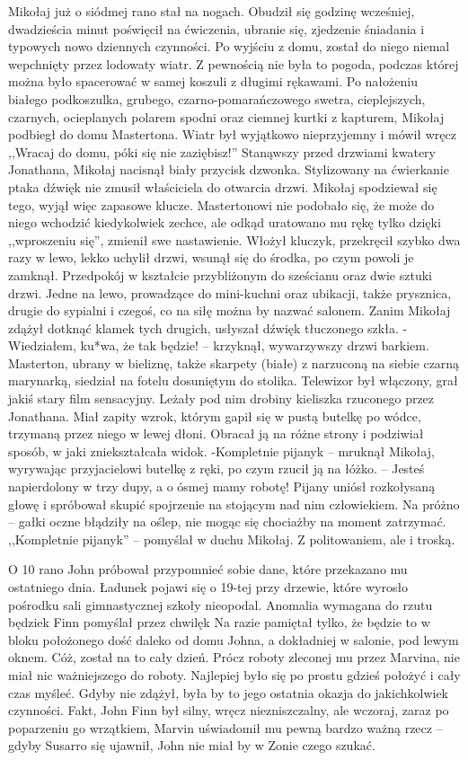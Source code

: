 \documentclass[../MAIN.tex]{subfiles}
\begin{document}
Mikołaj już o siódmej rano stał na nogach. Obudził się godzinę wcześniej, dwadzieścia minut poświęcił na ćwiczenia, ubranie się, zjedzenie śniadania i typowych nowo dziennych czynności. Po wyjściu z domu, został do niego niemal wepchnięty przez lodowaty wiatr. Z pewnością nie była to pogoda, podczas której można było spacerować w samej koszuli z długimi rękawami.
Po nałożeniu białego podkoszulka, grubego, czarno-pomarańczowego swetra, cieplejszych, czarnych, ocieplanych polarem spodni oraz ciemnej kurtki z kapturem, Mikołaj podbiegł do domu Mastertona. Wiatr był wyjątkowo nieprzyjemny i mówił wręcz ,,Wracaj do domu, póki się nie zaziębisz!''
Stanąwszy przed drzwiami kwatery Jonathana, Mikołaj nacisnął biały przycisk dzwonka. Stylizowany na ćwierkanie ptaka dźwięk nie zmusił właściciela do otwarcia drzwi. Mikołaj spodziewał się tego, wyjął więc zapasowe klucze. Mastertonowi nie podobało się, że może do niego wchodzić kiedykolwiek zechce, ale odkąd uratowano mu rękę tylko dzięki ,,wproszeniu się'', zmienił swe nastawienie.
Włożył kluczyk, przekręcił szybko dwa razy w lewo, lekko uchylił drzwi, wsunął się do środka, po czym powoli je zamknął.
Przedpokój w kształcie przybliżonym do sześcianu oraz dwie sztuki drzwi. Jedne na lewo, prowadzące do mini-kuchni oraz ubikacji, także prysznica, drugie do sypialni i czegoś, co na siłę można by nazwać salonem. Zanim Mikołaj zdążył dotknąć klamek tych drugich, usłyszał dźwięk tłuczonego szkła.
-Wiedziałem, ku*wa, że tak będzie! -- krzyknął, wywarzywszy drzwi barkiem.
Masterton, ubrany w bieliznę, także skarpety (białe) z narzuconą na siebie czarną marynarką, siedział na fotelu dosuniętym do stolika. Telewizor był włączony, grał jakiś stary film sensacyjny. Leżały pod nim drobiny kieliszka rzuconego przez Jonathana. Miał zapity wzrok, którym gapił się w pustą butelkę po wódce, trzymaną przez niego w lewej dłoni. Obracał ją na różne strony i podziwiał sposób, w jaki zniekształcała widok.
-Kompletnie pijany\3k -- mruknął Mikołaj, wyrywając przyjacielowi butelkę z ręki, po czym rzucił ją na łóżko. -- Jesteś napierdolony w trzy dupy, a o ósmej mamy robotę!
Pijany uniósł rozkołysaną głowę i spróbował skupić spojrzenie na stojącym nad nim człowiekiem. Na próżno -- gałki oczne błądziły na oślep, nie mogąc się chociażby na moment zatrzymać. ,,Kompletnie pijany\3k'' -- pomyślał w duchu Mikołaj. Z politowaniem, ale i troską.

O 10 rano John próbował przypomnieć sobie dane, które przekazano mu ostatniego dnia. Ładunek pojawi się o 19-tej przy drzewie, które wyrosło pośrodku sali gimnastycznej szkoły nieopodal. Anomalia wymagana do rzutu będzie\3k
Finn pomyślał przez chwilę\3k
Na razie pamiętał tylko, że będzie to w bloku położonego dość daleko od domu Johna, a dokładniej w salonie, pod lewym oknem. Cóż, został na to cały dzień. Prócz roboty zleconej mu przez Marvina, nie miał nic ważniejszego do roboty. Najlepiej było się po prostu gdzieś położyć i cały czas myśleć. Gdyby nie zdążył, była by to jego ostatnia okazja do jakichkolwiek czynności. Fakt, John Finn był silny, wręcz niezniszczalny, ale wczoraj, zaraz po poparzeniu go wrzątkiem, Marvin uświadomił mu pewną bardzo ważną rzecz -- gdyby Susarro się ujawnił, John nie miał by w Zonie czego szukać.
\end{document}
